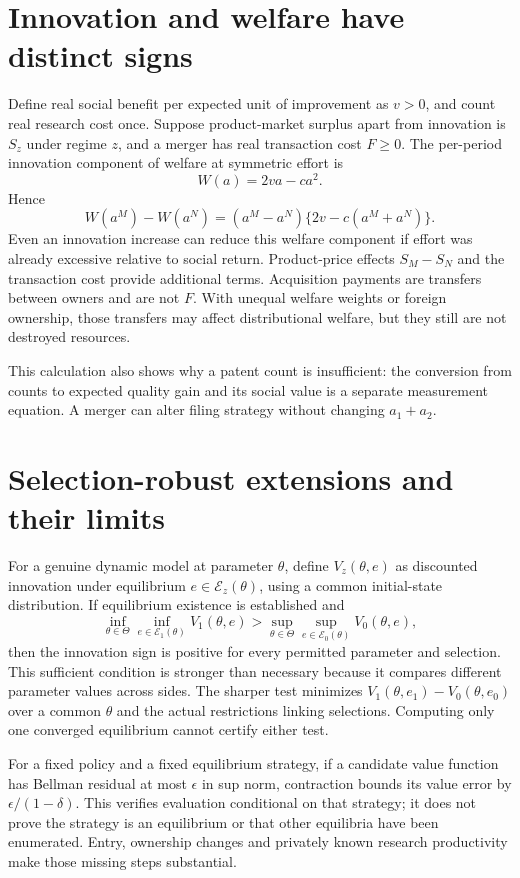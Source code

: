 \documentclass[11pt]{article}
\begin{document}
\section{Innovation and welfare have distinct signs}
Define real social benefit per expected unit of improvement as $v>0$, and count real research cost once. Suppose product-market surplus apart from innovation is $S_z$ under regime $z$, and a merger has real transaction cost $F\geq0$. The per-period innovation component of welfare at symmetric effort is
\[
 W(a)=2va-ca^2.
\]
Hence
\[
 W(a^M)-W(a^N)
 =(a^M-a^N)\{2v-c(a^M+a^N)\}.
\]
Even an innovation increase can reduce this welfare component if effort was already excessive relative to social return. Product-price effects $S_M-S_N$ and the transaction cost provide additional terms. Acquisition payments are transfers between owners and are not $F$. With unequal welfare weights or foreign ownership, those transfers may affect distributional welfare, but they still are not destroyed resources.

This calculation also shows why a patent count is insufficient: the conversion from counts to expected quality gain and its social value is a separate measurement equation. A merger can alter filing strategy without changing $a_1+a_2$.

\section{Selection-robust extensions and their limits}
For a genuine dynamic model at parameter $\theta$, define $V_z(\theta,e)$ as discounted innovation under equilibrium $e\in\mathcal E_z(\theta)$, using a common initial-state distribution. If equilibrium existence is established and
\[
 \inf_{\theta\in\Theta}\inf_{e\in\mathcal E_1(\theta)}V_1(\theta,e)
 >\sup_{\theta\in\Theta}\sup_{e\in\mathcal E_0(\theta)}V_0(\theta,e),
\]
then the innovation sign is positive for every permitted parameter and selection. This sufficient condition is stronger than necessary because it compares different parameter values across sides. The sharper test minimizes $V_1(\theta,e_1)-V_0(\theta,e_0)$ over a common $\theta$ and the actual restrictions linking selections. Computing only one converged equilibrium cannot certify either test.

For a fixed policy and a fixed equilibrium strategy, if a candidate value function has Bellman residual at most $\epsilon$ in sup norm, contraction bounds its value error by $\epsilon/(1-\delta)$. This verifies evaluation conditional on that strategy; it does not prove the strategy is an equilibrium or that other equilibria have been enumerated. Entry, ownership changes and privately known research productivity make those missing steps substantial.
\end{document}
